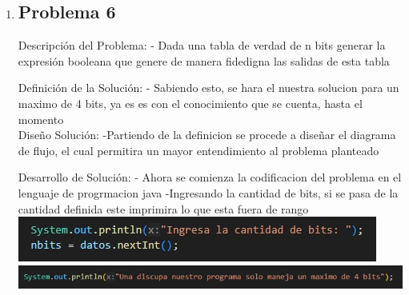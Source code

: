 \documentclass{IEEEcsmag}
\begin{document}
\begin{enumerate}
\item \subsection{Problema 6}

    Descripción del Problema:
    - Dada una tabla de verdad de n bits generar la expresión booleana que genere de manera fidedigna las salidas de esta tabla
    
    Definición de la Solución:
    - Sabiendo esto, se hara el nuestra solucion para un maximo de 4 bits, ya es es con el conocimiento que se cuenta, hasta el momento \\


    Diseño Solución:
    -Partiendo de la definicion se procede a diseñar el diagrama de flujo, el cual permitira un mayor entendimiento al problema planteado 
    
    Desarrollo de Solución:
    - Ahora se comienza la codificacion del problema en el lenguaje de progrmacion java 
    -Ingresando la cantidad de bits, si se pasa de la cantidad definida este imprimira lo que esta fuera de rango \\
    \centering
    \includegraphics[width=0.5\linewidth]{./latex_imagenes/Img_ejer6_1.jpg}  \\
    \centering
    \includegraphics[width=0.5\linewidth]{./latex_imagenes/Img_ejer6_6.jpg}  \\
    

\end{enumerate}
\end{document}
